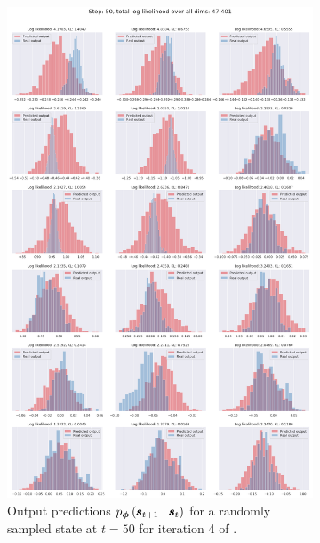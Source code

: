 \begin{figure}
\begin{subfigure}{\textwidth}
    \includegraphics[trim=0 1370 0 50,clip,width=1.0\textwidth]
    {img/windyslope/output/windyslope_output_det2stoc2_dist_10_step50_iter4.png}
    \caption{Output predictions $p_{\vph}\protect\given*{\vns}{\vs}$ for a randomly sampled state at $t=50$ for iteration 4 of \dettostoc{}.}
    \label{fig:output_distribution_step50_posvel_dettostoc}
\end{subfigure}
\begin{subfigure}{\textwidth}

\end{subfigure}
\end{figure}
